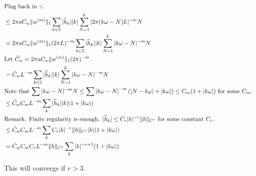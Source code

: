\documentclass[12pt]{article}
\newcommand{\Z}{\mathbb{Z}}
\newcommand{\hk}{\widehat{h}_k}
\begin{document}
\begin{equation*}
\begin{split}
     &\text{Plug back in $\gamma$.}\\
     &\leq 2\pi a C_w \|w^{(m)}\|_1 \sum_{k\in\Z} |\hk||k| \sum_{N=1}^L|2\pi(k\omega-N)L|^{-m} N\\
     &=2\pi a C_w \|w^{(m)}\|_1 (2\pi L)^{-m} \sum_{k\in\Z} |\hk||k| \sum_{N=1}^L|k\omega-N|^{-m} N\\
     &\text{Let $\Tilde{C}_w = 2\pi a C_w \|w^{(m)}\|_1 (2\pi)^{-m}$. }\\
     &=\Tilde{C}_w L^{-m} \sum_{k\in\Z} |\hk||k| \sum_{N=1}^L|k\omega-N|^{-m} N\\
     &\text{Note that $\sum|k\omega-N|^{-m}N\leq\sum\left|k\omega-N\right|^{-m}\left(|N-k\omega|+|k\omega|\right) 
     \leq C_m(1+|k\omega|)$ for some $C_m$.}\\
     &\leq\Tilde{C}_wC_m L^{-m} \sum_k |\hk||k|(1+|k\omega|)\\
     &\text{Remark. Finite regularity is enough. $|\hk|\leq C_r |k|^{-r}\|h\|_{C^r}$ for some constant $C_r$.}\\
     &\leq \Tilde{C}_wC_m L^{-m} \sum_k C_r|k|^{-r}\|h\|_{C^r}|k|(1+|k\omega|)\\
     &=\Tilde{C}_wC_m C_r L^{-m} \|h\|_{C^r} \sum_k |k|^{-r+1}(1+|k\omega|)
\end{split}\end{equation*}

This will converge if $r>3$. 
\end{document}
